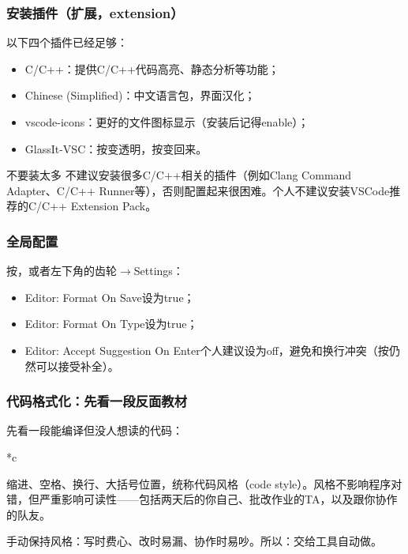 \begin{frame}
    \frametitle{安装插件（扩展，extension）}
    以下四个插件已经足够：
    \begin{itemize}
        \item \alert{C/C++}：提供C/C++代码高亮、静态分析等功能；
        \item \alert{Chinese (Simplified)}：中文语言包，界面汉化；
        \item \alert{vscode-icons}：更好的文件图标显示（安装后记得enable）；
        \item \alert{GlassIt-VSC}：按变透明，按变回来。
    \end{itemize}

    \begin{vspquotered}{不要装太多}
        不建议安装很多C/C++相关的插件（例如Clang Command Adapter、C/C++ Runner等），否则配置起来很困难。个人不建议安装VSCode推荐的C/C++ Extension Pack。
    \end{vspquotered}
\end{frame}

\begin{frame}
    \frametitle{全局配置}
    按，或者左下角的齿轮$\to$Settings：
    \begin{itemize}
        \item Editor: Format On Save设为true；
        \item Editor: Format On Type设为true；
        \item Editor: Accept Suggestion On Enter个人建议设为off，避免和换行冲突（按仍然可以接受补全）。
    \end{itemize}
\end{frame}

\begin{frame}
    \frametitle{代码格式化：先看一段反面教材}
    先看一段\alert{能编译}但没人想读的代码：
    \begin{Code}*{c}
        
    \end{Code}

    缩进、空格、换行、大括号位置，统称\alert{代码风格}（code style）。风格不影响程序对错，但严重影响可读性——包括两天后的你自己、批改作业的TA，以及跟你协作的队友。

    手动保持风格：写时费心、改时易漏、协作时易吵。所以：\alert{交给工具自动做}。
\end{frame}

